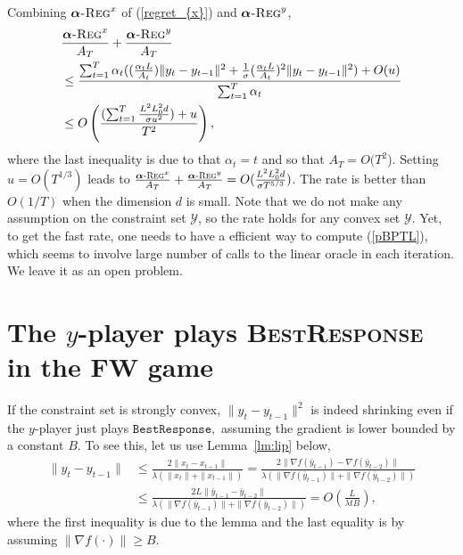 \documentclass[pmlr]{jmlr} %
\def\balpha{\boldsymbol{\alpha}}
\def\BR{\textsc{BestResponse}\xspace}
\newcommand{\regret}[1]{\balpha\textsc{-Reg}^{#1}}
\newcommand{\YY}{\mathcal{Y}}
\newcommand{\pr}[1]{\left(#1\right)}
\begin{document}
Combining $\regret{x}$ of (\ref{regret_{x}}) and $\regret{y}$,
\begin{equation}
\begin{aligned}
&\frac{ \regret{x} }{ A_{T}} + \frac{ \regret{y} }{ A_{T}}
\\ & \leq  \frac{\sum_{t=1}^{T}
\alpha_{t}  ( (\frac{\alpha_{t} L}{A_{t}})  \| y_{t} - y_{t-1} \|^{2} + \frac{1}{\sigma} (\frac{\alpha_{t} L }{A_{t}})^{2}  \| y_{t} - y_{t-1} \|^{2} ) + O(u)
 }{ \sum_{t=1}^{T} \alpha_{t}}
\\ & \leq  O\pr{ \frac{ (\sum_{t=1}^{T} \frac{L^{2} L_{0}^{2} d}{ \sigma u^{2}} ) + u }{T^{2}} },
\end{aligned}
\end{equation}
where the last inequality is due to that $\alpha_{t} = t$ and so that $A_{T} = O(T^{2}$). Setting $u=O(T^{{1/3}})$ leads to 
$\frac{ \regret{x} }{ A_{T}} + \frac{ \regret{y} }{ A_{T}}  =O(\frac{L^{2} L_{0}^{2} d}{\sigma T^{5/3}})$.
The rate is better than $O(1/T)$ when the dimension $d$ is small.
Note that we do not make any assumption on the constraint set $\YY$, so the rate holds for any convex set $\YY$.
Yet, to get the fast rate, one needs to have a efficient way to compute (\ref{pBPTL}),
which seems to involve large number of calls to the linear oracle in each iteration.
We leave it as an open problem.

\section{The $y$-player plays \BR in the FW game} \label{app:BR}


If the constraint set is strongly convex, $\| y_{t} - y_{t-1}  \|^{2}$ is indeed shrinking even if the $y$-player just plays $\texttt{BestResponse},$
assuming the gradient is lower bounded by a constant $B$.
To see this, let us use Lemma~\ref{lm:lip} below, 
\begin{equation} \label{shrink}
\begin{aligned}
\| y_{t} - y_{t-1}\| & \leq \frac{ 2 \| x_{t} - x_{t-1} \|}{ \lambda ( \| x_{t}\| + \| x_{t-1}\| ) }
= \frac{ 2 \| \nabla f( \bar{y}_{t-1}) - \nabla f( \bar{y}_{t-2}) \|}{ \lambda ( \| \nabla f( \bar{y}_{t-1})\| + \| \nabla f( \bar{y}_{t-2})\| ) }
\\ & \leq 
\frac{ 2 L \| \bar{y}_{t-1} - \bar{y}_{t-2} \|}{ \lambda ( \| \nabla f( \bar{y}_{t-1})\| + \| \nabla f( \bar{y}_{t-2})\| ) }
= O( \frac{L}{\lambda t B}),
\end{aligned}
\end{equation}
where the first inequality is due to the lemma and the last equality is by assuming 
$\| \nabla f( \cdot)\| \geq B$.
\end{document}
